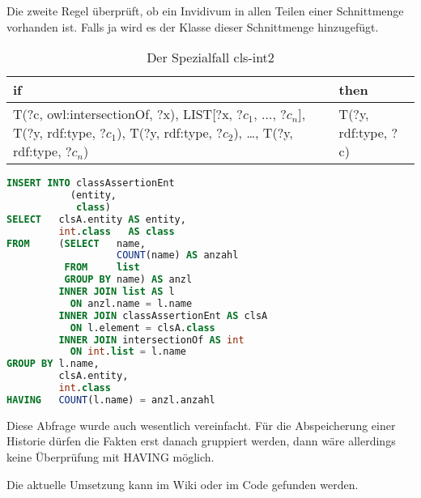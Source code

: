 Die zweite Regel überprüft, ob ein Invidivum in allen Teilen einer Schnittmenge vorhanden ist. Falls ja wird es der Klasse dieser Schnittmenge hinzugefügt.
\begin{table}[htb]
\begin{center}
	\begin{tabular}{m{5cm}|m{3.5cm}}
	if & then \\ \hline
	T(?c, owl:intersectionOf, ?x),\newline
	LIST[?x, ?$c_1$, ..., ?$c_n$],\newline
	T(?y, rdf:type, ?$c_1$),\newline
	T(?y, rdf:type, ?$c_2$),\newline
	\ldots,\newline
	T(?y, rdf:type, ?$c_n$) & T(?y, rdf:type, ?c) 	 
	\end{tabular}
\end{center}
	\caption{Der Spezialfall cls-int2}
	\label{rule-cls-int2}
\end{table}


\begin{lstlisting}[language=SQL]
INSERT INTO classAssertionEnt
           (entity,
            class)
SELECT   clsA.entity AS entity,
         int.class   AS class
FROM     (SELECT   name,
                   COUNT(name) AS anzahl
          FROM     list
          GROUP BY name) AS anzl
         INNER JOIN list AS l
           ON anzl.name = l.name
         INNER JOIN classAssertionEnt AS clsA
           ON l.element = clsA.class
         INNER JOIN intersectionOf AS int
           ON int.list = l.name
GROUP BY l.name,
         clsA.entity,
         int.class
HAVING   COUNT(l.name) = anzl.anzahl
\end{lstlisting}

Diese Abfrage wurde auch wesentlich vereinfacht. Für die Abspeicherung einer Historie dürfen die Fakten erst danach gruppiert werden, dann wäre allerdings keine Überprüfung mit HAVING möglich.

Die aktuelle Umsetzung kann im Wiki oder im Code gefunden werden.

